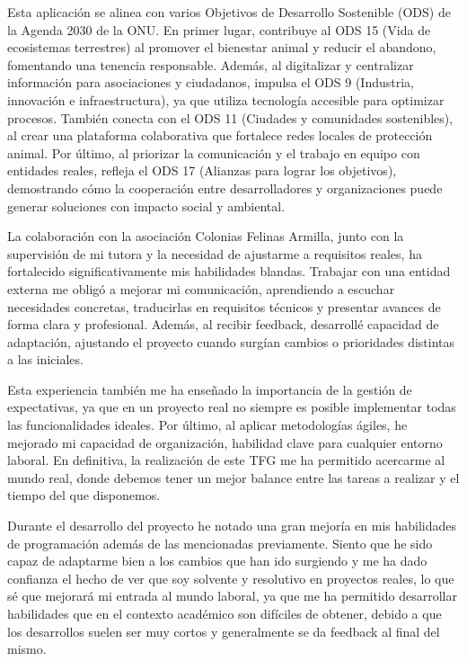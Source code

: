   Esta aplicación se alinea con varios Objetivos de Desarrollo Sostenible (ODS) \cite{ods} de la Agenda 2030 de la ONU. En primer lugar, contribuye al ODS 15 (Vida de ecosistemas terrestres) al promover el bienestar animal y reducir el abandono, fomentando una tenencia responsable. Además, al digitalizar y centralizar información para asociaciones y ciudadanos, impulsa el ODS 9 (Industria, innovación e infraestructura), ya que utiliza tecnología accesible para optimizar procesos. También conecta con el ODS 11 (Ciudades y comunidades sostenibles), al crear una plataforma colaborativa que fortalece redes locales de protección animal. Por último, al priorizar la comunicación y el trabajo en equipo con entidades reales, refleja el ODS 17 (Alianzas para lograr los objetivos), demostrando cómo la cooperación entre desarrolladores y organizaciones puede generar soluciones con impacto social y ambiental.
  
  La colaboración con la asociación Colonias Felinas Armilla, junto con la supervisión de mi tutora y la necesidad de ajustarme a requisitos reales, ha fortalecido significativamente mis habilidades blandas. Trabajar con una entidad externa me obligó a mejorar mi comunicación, aprendiendo a escuchar necesidades concretas, traducirlas en requisitos técnicos y presentar avances de forma clara y profesional. Además, al recibir feedback, desarrollé capacidad de adaptación, ajustando el proyecto cuando surgían cambios o prioridades distintas a las iniciales.
  
  Esta experiencia también me ha enseñado la importancia de la gestión de expectativas, ya que en un proyecto real no siempre es posible implementar todas las funcionalidades ideales. Por último, al aplicar metodologías ágiles, he mejorado mi capacidad de organización, habilidad clave para cualquier entorno laboral. En definitiva, la realización de este TFG me ha permitido acercarme al mundo real, donde debemos tener un mejor balance entre las tareas a realizar y el tiempo del que disponemos.
  
  Durante el desarrollo del proyecto he notado una gran mejoría en mis habilidades de programación además de las mencionadas previamente. Siento que he sido capaz de adaptarme bien a los cambios que han ido surgiendo y me ha dado confianza el hecho de ver que soy solvente y resolutivo en proyectos reales, lo que sé que mejorará mi entrada al mundo laboral, ya que me ha permitido desarrollar habilidades que en el contexto académico son difíciles de obtener, debido a que los desarrollos suelen ser muy cortos y generalmente se da feedback al final del mismo.


